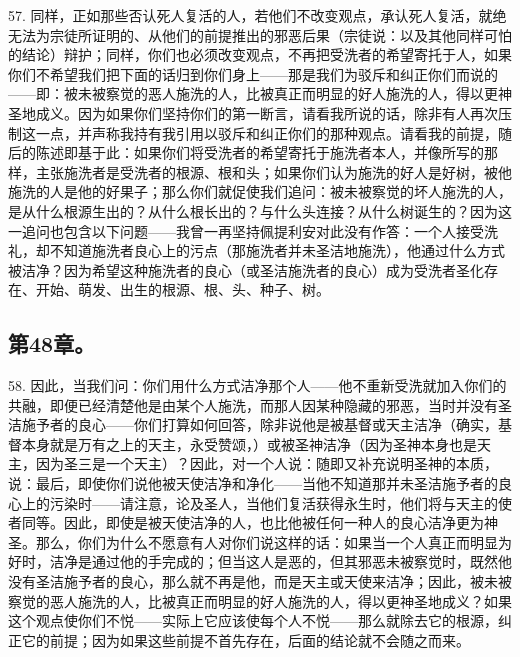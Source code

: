 57. 同样，正如那些否认死人复活的人，若他们不改变观点，承认死人复活，就绝无法为宗徒所证明的、从他们的前提推出的邪恶后果（宗徒说：以及其他同样可怕的结论）辩护；同样，你们也必须改变观点，不再把受洗者的希望寄托于人，如果你们不希望我们把下面的话归到你们身上——那是我们为驳斥和纠正你们而说的——即：被未被察觉的恶人施洗的人，比被真正而明显的好人施洗的人，得以更神圣地成义。因为如果你们坚持你们的第一断言，请看我所说的话，除非有人再次压制这一点，并声称我持有我引用以驳斥和纠正你们的那种观点。请看我的前提，随后的陈述即基于此：如果你们将受洗者的希望寄托于施洗者本人，并像所写的那样，主张施洗者是受洗者的根源、根和头；如果你们认为施洗的好人是好树，被他施洗的人是他的好果子；那么你们就促使我们追问：被未被察觉的坏人施洗的人，是从什么根源生出的？从什么根长出的？与什么头连接？从什么树诞生的？因为这一追问也包含以下问题——我曾一再坚持佩提利安对此没有作答：一个人接受洗礼，却不知道施洗者良心上的污点（那施洗者并未圣洁地施洗），他通过什么方式被洁净？因为希望这种施洗者的良心（或圣洁施洗者的良心）成为受洗者圣化存在、开始、萌发、出生的根源、根、头、种子、树。\par


\subsection{第48章。}

58. 因此，当我们问：你们用什么方式洁净那个人——他不重新受洗就加入你们的共融，即便已经清楚他是由某个人施洗，而那人因某种隐藏的邪恶，当时并没有圣洁施予者的良心——你们打算如何回答，除非说他是被基督或天主洁净（确实，基督本身就是万有之上的天主，永受赞颂，）或被圣神洁净（因为圣神本身也是天主，因为圣三是一个天主）？因此，对一个人说：随即又补充说明圣神的本质，说：最后，即使你们说他被天使洁净和净化——当他不知道那并未圣洁施予者的良心上的污染时——请注意，论及圣人，当他们复活获得永生时，他们将与天主的使者同等。因此，即使是被天使洁净的人，也比他被任何一种人的良心洁净更为神圣。那么，你们为什么不愿意有人对你们说这样的话：如果当一个人真正而明显为好时，洁净是通过他的手完成的；但当这人是恶的，但其邪恶未被察觉时，既然他没有圣洁施予者的良心，那么就不再是他，而是天主或天使来洁净；因此，被未被察觉的恶人施洗的人，比被真正而明显的好人施洗的人，得以更神圣地成义？如果这个观点使你们不悦——实际上它应该使每个人不悦——那么就除去它的根源，纠正它的前提；因为如果这些前提不首先存在，后面的结论就不会随之而来。\par


